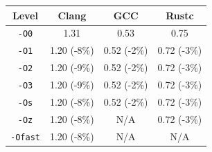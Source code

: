 \begin{tabular*}{\columnwidth}{@{\extracolsep\fill}cccc@{\extracolsep\fill}}
\toprule
\textbf{Level} & \textbf{Clang} & \textbf{GCC} & \textbf{Rustc} \\
\midrule
\texttt{-O0} & 1.31 & 0.53 & 0.75 \\
\texttt{-O1} & 1.20 (-8\%) & 0.52 (-2\%) & 0.72 (-3\%) \\
\texttt{-O2} & 1.20 (-9\%) & 0.52 (-2\%) & 0.72 (-3\%) \\
\texttt{-O3} & 1.20 (-9\%) & 0.52 (-2\%) & 0.72 (-3\%) \\
\texttt{-Os} & 1.20 (-8\%) & 0.52 (-2\%) & 0.72 (-3\%) \\
\texttt{-Oz} & 1.20 (-8\%) & N/A & 0.72 (-3\%) \\
\texttt{-Ofast} & 1.20 (-8\%) & N/A & N/A \\
\bottomrule
\end{tabular*}

